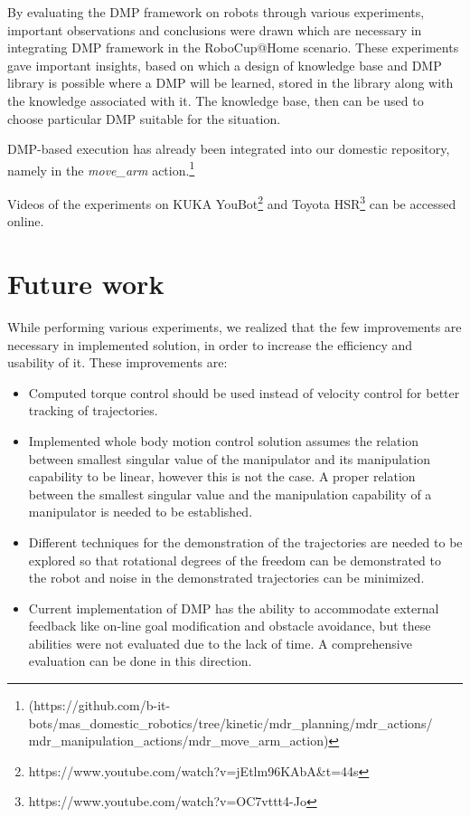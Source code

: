 By evaluating the DMP framework on robots through various experiments, important observations and conclusions were drawn which are necessary in integrating DMP framework in the RoboCup@Home scenario. These experiments gave important insights, based on which a design of knowledge base and DMP library is possible where a DMP will be learned, stored in the library along with the knowledge associated with it. The knowledge base, then can be used to choose particular DMP suitable for the situation. 

DMP-based execution has already been integrated into our domestic repository, namely in the \textit{move\_arm} action.\footnote{(https://github.com/b-it-bots/mas\_domestic\_robotics/tree/kinetic/mdr\_planning/mdr\_actions/\\mdr\_manipulation\_actions/mdr\_move\_arm\_action)} 

Videos of the experiments on KUKA YouBot\footnote{https://www.youtube.com/watch?v=jEtlm96KAbA\&t=44s} and Toyota HSR\footnote{https://www.youtube.com/watch?v=OC7vttt4-Jo} can be accessed online. 

\section{Future work}

While performing various experiments, we realized that the few improvements are necessary in implemented solution, in order to increase the efficiency and usability of it. These improvements are:

\begin{itemize}
	\item Computed torque control should be used instead of velocity control for better tracking of trajectories. 
	\item Implemented whole body motion control solution assumes the relation between smallest singular value of the manipulator and its manipulation capability to be linear, however this is not the case. A proper relation between the smallest singular value and the manipulation capability of a manipulator is needed to be established.  
	\item Different techniques for the demonstration of the trajectories are needed to be explored so that rotational degrees of the freedom can be demonstrated to the robot and noise in the demonstrated trajectories can be minimized. 
	\item Current implementation of DMP has the ability to accommodate external feedback like on-line goal modification and obstacle avoidance, but these abilities were not evaluated due to the lack of time. A comprehensive evaluation can be done in this direction. 
\end{itemize}

